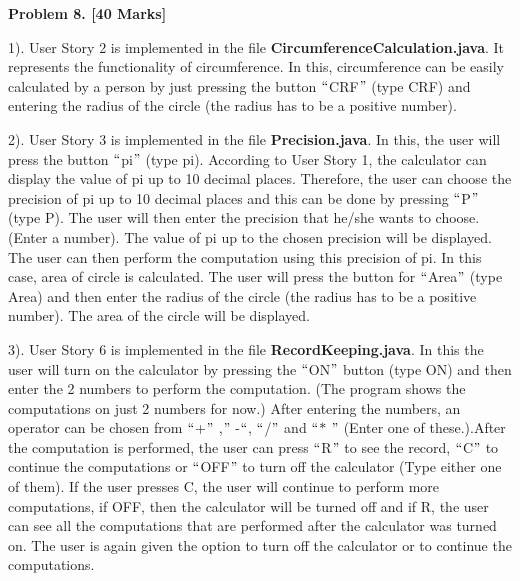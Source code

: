 \documentclass[12pt]{article}
\begin{document}


\vspace{\baselineskip}
{\fontsize{14pt}{16.8pt}\selectfont \textbf{Problem 8. [40 Marks]}\par}\par

1). User Story 2 is implemented in the file \textbf{CircumferenceCalculation.java}. It represents the functionality of circumference. In this, circumference can be easily calculated by a person by just pressing the button $``$CRF$"$  (type CRF) and entering the radius of the circle (the radius has to be a positive number).\par

2). User Story 3 is implemented in the file \textbf{Precision.java}. In this, the user will press the button $``$pi$"$  (type pi). According to User Story 1, the calculator can display the value of pi up to 10 decimal places. Therefore, the user can choose the precision of pi up to 10 decimal places and this can be done by pressing $``$P$"$  (type P). The user will then enter the precision that he/she wants to choose. (Enter a number). The value of pi up to the chosen precision will be displayed. The user can then perform the computation using this precision of pi. In this case, area of circle is calculated. The user will press the button for $``$Area$"$  (type Area) and then enter the radius of the circle (the radius has to be a positive number). The area of the circle will be displayed.\par

3). User Story 6 is implemented in the file \textbf{RecordKeeping.java}. In this the user will turn on the calculator by pressing the $``$ON$"$  button (type ON) and then enter the 2 numbers to perform the computation. (The program shows the computations on just 2 numbers for now.) After entering the numbers, an operator can be chosen from $``$+$"$ ,$"$ -$``$, $``$/$"$  and $``$$\ast$ $"$ (Enter one of these.).After the computation is performed, the user can press $``$R$"$  to see the record, $``$C$"$  to continue the computations or $``$OFF$"$  to turn off the calculator (Type either one of them). If the user presses C, the user will continue to perform more computations, if OFF, then the calculator will be turned off and if R, the user can see all the computations that are performed after the calculator was turned on. The user is again given the option to turn off the calculator or to continue the computations.\par
\end{document}
